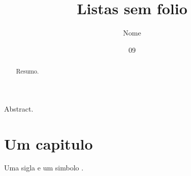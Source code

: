 \documentclass[dsc]{ufrj}
\title{Listas sem folio}
\author{Nome}{Sobrenome}
\date{09}{2026}
\begin{document}
  \maketitle
  \frontmatter
  \begin{abstract}Resumo.\end{abstract}
  \begin{foreignabstract}Abstract.\end{foreignabstract}
  \printloabbreviations
  \printlosymbols
  \tableofcontents
  \mainmatter
  \chapter{Um capitulo}
  Uma sigla  e um simbolo
  .
\end{document}
